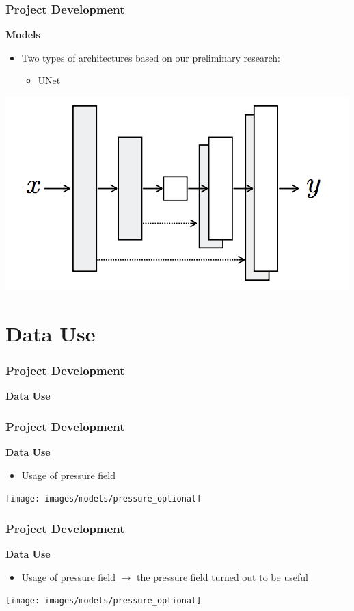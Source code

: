 \documentclass[18pt]{beamer}
\begin{document}
\begin{frame}[t]
  \frametitle{Project Development}
  \large{\textbf{Models}}
  \begin{itemize}
  \item Two types of architectures based on our preliminary research:
    \begin{itemize}
    \item UNet
    \end{itemize}
  \end{itemize}
  \vspace{1cm}
  \begin{center}
    \includegraphics[scale=0.37]{images/nets/unet}
  \end{center}  
\end{frame}

\section{Data Use}
\begin{frame}[t]
  \frametitle{Project Development}
  \large{\textbf{Data Use}}
\end{frame}


\begin{frame}[t]
  \frametitle{Project Development}
  \large{\textbf{Data Use}}
  \begin{itemize}
  \item Usage of pressure field
  \end{itemize}
  \vspace{0.5cm}
  \begin{center}
    \texttt{[image: images/models/pressure\_optional]}
  \end{center}  
\end{frame}


\begin{frame}[t]
  \frametitle{Project Development}
  \large{\textbf{Data Use}}
  \begin{itemize}
  \item Usage of pressure field $\rightarrow$ the pressure field turned out to be useful
  \end{itemize}
  \vspace{0.5cm}
  \begin{center}
    \texttt{[image: images/models/pressure\_optional]}
  \end{center}  
\end{frame}
\end{document}
